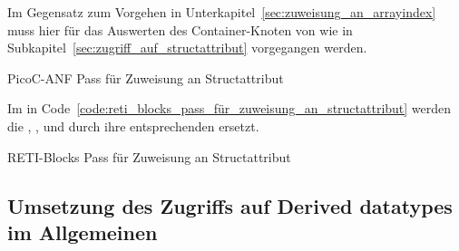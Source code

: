 Im Gegensatz zum Vorgehen in Unterkapitel~\ref{sec:zuweisung_an_arrayindex} muss hier für das Auswerten des  Container-Knoten  von  wie in Subkapitel~\ref{sec:zugriff_auf_structattribut} vorgegangen werden.

\begin{code}
  \centering
  \caption{PicoC-ANF Pass für Zuweisung an Structattribut}
  \label{code:picoc_mon_pass_für_zuweisung_an_structattribut}
\end{code}

Im  in Code~\ref{code:reti_blocks_pass_für_zuweisung_an_structattribut} werden die  , ,  und  durch ihre entsprechenden  ersetzt.

\begin{code}
  \centering
  \caption{RETI-Blocks Pass für Zuweisung an Structattribut}
  \label{code:reti_blocks_pass_für_zuweisung_an_structattribut}
\end{code}

\subsection{Umsetzung des Zugriffs auf Derived datatypes im Allgemeinen}
